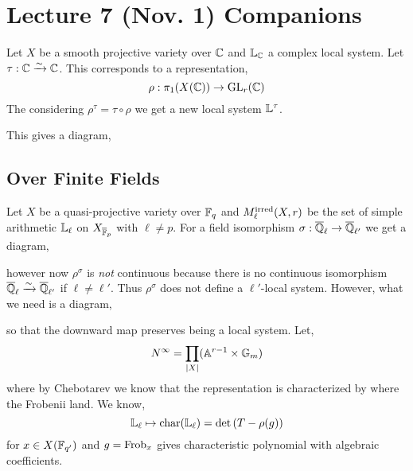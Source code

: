 \documentclass[12pt]{article}
\begin{document}
\section{Lecture 7 (Nov. 1) Companions}

Let $X$ be a smooth projective variety over $\mathbb{C}$ and $\mathbb{L}_{\mathbb{C}}$ a complex local system. Let $\tau : \mathbb{C} \xrightarrow{\sim} \mathbb{C}$. This corresponds to a representation,
\[ \rho : \pi_1(X(\mathbb{C})) \to \mathrm{GL}_r(\mathbb{C}) \]
The considering $\rho^{\tau} = \tau \circ \rho$ we get a new local system $\mathbb{L}^\tau$. 

This gives a diagram,
\begin{center}
\end{center}

\subsection{Over Finite Fields}

Let $X$ be a quasi-projective variety over $\mathbb{F}_q$ and $M^{\mathrm{irred}}_\ell(X,r)$ be the set of simple arithmetic $\mathbb{L}_{\ell}$ on $X_{\overline{\mathbb{F}}_p}$ with $\ell \neq p$. For a field isomorphism $\sigma : \overline{\mathbb{Q}}_{\ell} \to \overline{\mathbb{Q}}_{\ell'}$ we get a diagram,
\begin{center}
\end{center}
however now $\rho^{\sigma}$ is \textit{not} continuous because there is no continuous isomorphism $\overline{\mathbb{Q}}_{\ell} \xrightarrow{\sim} \overline{\mathbb{Q}}_{\ell'}$ if $\ell \neq \ell'$. Thus $\rho^{\sigma}$ does not define a $\ell'$-local system. However, what we need is a diagram,
\begin{center}
\end{center}
so that the downward map preserves being a local system. 
Let,
\[ N^\infty = \prod_{|X|} (\mathbb{A}^{r-1} \times \mathbb{G}_m) \]
where by Chebotarev we know that the representation is characterized by where the Frobenii land. We know,
\[ \mathbb{L}_{\ell} \mapsto \mathrm{char}(\mathbb{L}_\ell) = \det{(T - \rho(g))} \]
for $x \in X(\mathbb{F}_{q'})$ and $g = \mathrm{Frob}_x$ gives characteristic polynomial with algebraic coefficients.
\end{document}
